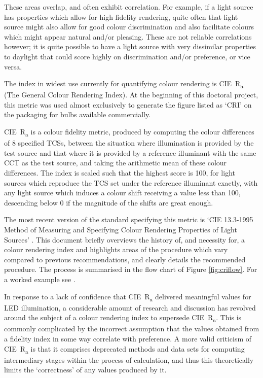 These areas overlap, and often exhibit correlation. For example, if a light source has properties which allow for high fidelity rendering, quite often that light source might also allow for good colour discrimination and also facilitate colours which might appear natural and/or pleasing. These are not reliable correlations however; it is quite possible to have a light source with very dissimilar properties to daylight that could score highly on discrimination and/or preference, or vice versa.

The index in widest use currently for quantifying colour rendering is \gls{CIE}~R\textsubscript{a} (The General Colour Rendering Index). At the beginning of this doctoral project, this metric was used almost exclusively to generate the figure listed as `CRI' on the packaging for bulbs available commercially. %

\gls{CIE}~R\textsubscript{a} is a colour fidelity metric, produced by computing the colour differences of 8 specified \glspl{TCS}, between the situation where illumination is provided by the test source and that where it is provided by a reference illuminant with the same \gls{CCT} as the test source, and taking the arithmetic mean of these colour differences. The index is scaled such that the highest score is 100, for light sources which reproduce the \gls{TCS} set under the reference illuminant exactly, with any light source which induces a colour shift receiving a value less than 100, descending below 0 if the magnitude of the shifts are great enough.

The most recent version of the standard specifying this metric is `\gls{CIE} 13.3-1995 Method of Measuring and Specifying Colour Rendering Properties of Light Sources' \citep{cie_cie_1995}. This document briefly overviews the history of, and necessity for, a colour rendering index and highlights areas of the procedure which vary compared to previous recommendations, and clearly details the recommended procedure. The process is summarised in the flow chart of Figure \ref{fig:criflow}. For a worked example see \citet[p.388]{hunt_measuring_2011}.

In response to a lack of confidence that \gls{CIE}~R\textsubscript{a} delivered meaningful values for \gls{LED} illumination, a considerable amount of research and discussion has revolved around the subject of a colour rendering index to supersede \gls{CIE}~R\textsubscript{a}. This is commonly complicated by the incorrect assumption that the values obtained from a fidelity index in some way correlate with preference. A more valid criticism of \gls{CIE}~R\textsubscript{a} is that it comprises deprecated methods and data sets for computing intermediary stages within the process of calculation, and thus this theoretically limits the `correctness' of any values produced by it.

